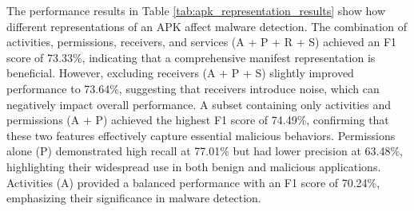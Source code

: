 \begin{table}[b!]
    \caption{\label{tab:apk_representation_results}%
    Performance of different APK representations using frozen ModernBERT embeddings. Features are extracted from Android manifest.xml (A=Activities, P=Permissions, R=Receivers, S=Services). Results reported on time-based transcend subset split after five epochs.}
\end{table}

The performance results in Table \ref{tab:apk_representation_results} 
show how different representations of an APK affect malware detection. 
The combination of activities, permissions, receivers, and services (A + P + R + S) achieved an F1 score of 73.33\%, 
indicating that a comprehensive manifest representation is beneficial. 
However, excluding receivers (A + P + S) slightly improved performance to 73.64\%, 
suggesting that receivers introduce noise, which can negatively impact overall performance.
A subset containing only activities and permissions (A + P) achieved the highest F1 score of 74.49\%, 
confirming that these two features effectively capture essential malicious behaviors. 
Permissions alone (P) demonstrated high recall at 77.01\% but had lower precision at 63.48\%, 
highlighting their widespread use in both benign and malicious applications. 
Activities (A) provided a balanced performance with an F1 score of 70.24\%, 
emphasizing their significance in malware detection.

